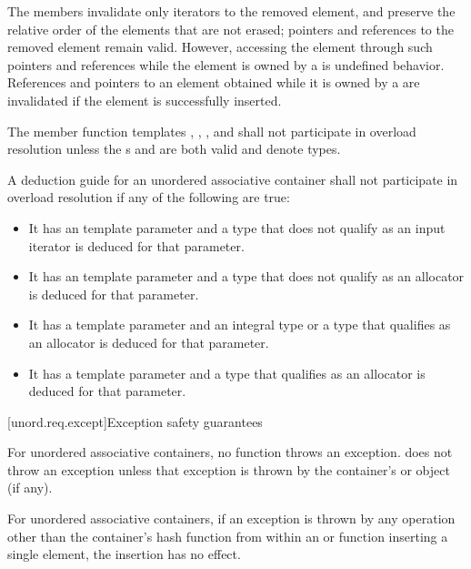 \pnum
The  members invalidate only iterators to the removed element,
and preserve the relative order of the elements that are not erased; pointers
and references to the removed element remain valid. However, accessing the
element through such pointers and references while the element is owned by a
 is undefined behavior. References and pointers to an element
obtained while it is owned by a  are invalidated if the
element is successfully inserted.

\pnum
The member function templates
, , , and 
shall not participate in overload resolution unless
the s
 and
are both valid and denote types.

\pnum
A deduction guide for an unordered associative container shall not participate in overload resolution
if any of the following are true:
\begin{itemize}
\item It has an  template parameter
and a type that does not qualify as an input iterator is deduced for that parameter.

\item It has an  template parameter
and a type that does not qualify as an allocator is deduced for that parameter.

\item It has a  template parameter
and an integral type or a type that qualifies as an allocator is deduced for that parameter.

\item It has a  template parameter
and a type that qualifies as an allocator is deduced for that parameter.
\end{itemize}

[unord.req.except]{Exception safety guarantees}

\pnum
{}%
%
For unordered associative containers, no  function
throws an exception.  does not throw an
exception unless that exception is thrown by the container's  or
 object (if any).

\pnum
For unordered associative containers, if an exception is thrown by any
operation other than the container's hash function from within an
 or  function inserting a single element,
the insertion has no effect.

